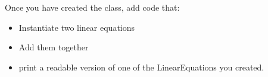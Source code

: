 \documentclass{article}
\begin{document}
\begin{enumerate}
		Once you have created the class, add code that:
		\begin{itemize}
			\item Instantiate two linear equations
			\item Add them together
			\item print a readable version of one of the LinearEquations you created.
		\end{itemize}



\end{enumerate}
\pagebreak
\end{document}

